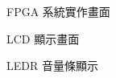 \begin{figure}[H]
\centering
{}
\caption{FPGA 系統實作畫面}
\end{figure}

\begin{figure}[H]
\centering
{}
\caption{LCD 顯示畫面}
\end{figure}

\begin{figure}[H]
\centering
{}
\caption{LEDR 音量條顯示}
\end{figure}
